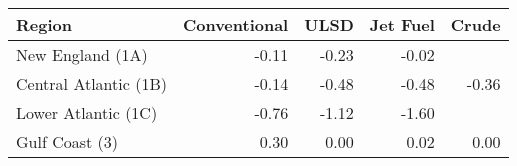 \begin{tabular}{lrrrr}
  \hline
Region & Conventional & ULSD & Jet Fuel & Crude \\ 
  \hline
New England (1A) & -0.11 & -0.23 & -0.02 &  \\ 
  Central Atlantic (1B) & -0.14 & -0.48 & -0.48 & -0.36 \\ 
  Lower Atlantic (1C) & -0.76 & -1.12 & -1.60 &  \\ 
  Gulf Coast (3) & 0.30 & 0.00 & 0.02 & 0.00 \\ 
   \hline
\end{tabular}
